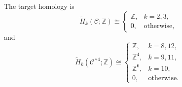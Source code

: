 \begin{theorem}
The target homology is
\begin{equation}
 \widetilde H_k(\mathcal C;\mathbb Z)\cong
 \begin{cases}
  \mathbb Z,&k=2,3,\\
  0,&\text{otherwise},
 \end{cases}
 \label{cusp-cone-C-homology}
\end{equation}
and
\begin{equation}
 \widetilde H_k(\mathcal C^{\wedge4};\mathbb Z)\cong
 \begin{cases}
  \mathbb Z,&k=8,12,\\
  \mathbb Z^4,&k=9,11,\\
  \mathbb Z^6,&k=10,\\
  0,&\text{otherwise}.
 \end{cases}
 \label{cusp-cone-C-smash-homology}
\end{equation}
\end{theorem}

